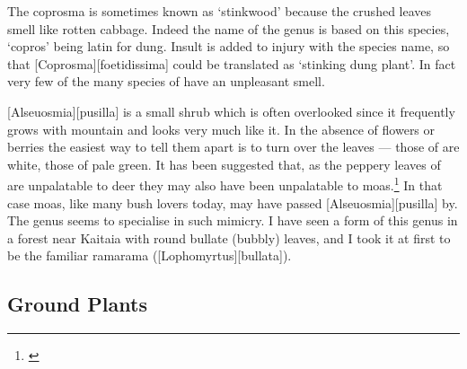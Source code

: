 The coprosma is sometimes known as `stinkwood' because the crushed leaves smell like rotten cabbage.
Indeed the name of the genus is based on this species, `copros' being latin for dung.
Insult is added to injury with the species name, so that [Coprosma][foetidissima] could be translated as `stinking dung plant'.
In fact very few of the many species of  have an unpleasant smell.

[Alseuosmia][pusilla] is a small shrub which is often overlooked since it frequently grows with mountain  and looks very much like it.
In the absence of flowers or berries the easiest way to tell them apart is to turn over the leaves --- those of  are white, those of  pale green.
It has been suggested that, as the peppery leaves of  are unpalatable to deer they may also have been unpalatable to moas.\footnote{\cite{greenwood1977evolution}}
In that case moas, like many bush lovers today, may have passed [Alseuosmia][pusilla] by.
The genus  seems to specialise in such mimicry.
I have seen a form of this genus in a forest near Kaitaia with round bullate (bubbly) leaves, and I took it at first to be the familiar ramarama ([Lophomyrtus][bullata]).

\subsection{Ground Plants}

